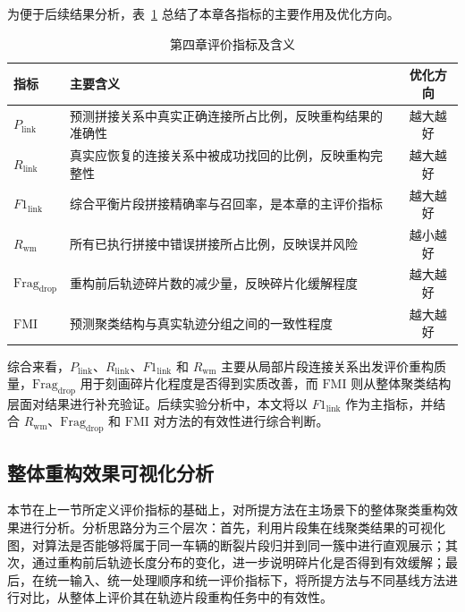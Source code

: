 \documentclass{xdupgthesis}
\begin{document}
为便于后续结果分析，表~\ref{tab:ch4_metric_summary} 总结了本章各指标的主要作用及优化方向。

\begin{table}[htbp]
	\centering
	\caption{第四章评价指标及含义}
	\label{tab:ch4_metric_summary}
	\renewcommand{\arraystretch}{1.2}
	\begin{tabular}{p{}p{}c}
		\toprule
		指标 & 主要含义 & 优化方向 \\
		\midrule
		$P_{\mathrm{link}}$ & 预测拼接关系中真实正确连接所占比例，反映重构结果的准确性 & 越大越好 \\
		$R_{\mathrm{link}}$ & 真实应恢复的连接关系中被成功找回的比例，反映重构完整性 & 越大越好 \\
		$F1_{\mathrm{link}}$ & 综合平衡片段拼接精确率与召回率，是本章的主评价指标 & 越大越好 \\
		$R_{\mathrm{wm}}$ & 所有已执行拼接中错误拼接所占比例，反映误并风险 & 越小越好 \\
		$\mathrm{Frag}_{\mathrm{drop}}$ & 重构前后轨迹碎片数的减少量，反映碎片化缓解程度 & 越大越好 \\
		$\mathrm{FMI}$ & 预测聚类结构与真实轨迹分组之间的一致性程度 & 越大越好 \\
		\bottomrule
	\end{tabular}
\end{table}

综合来看，$P_{\mathrm{link}}$、$R_{\mathrm{link}}$、$F1_{\mathrm{link}}$ 和 $R_{\mathrm{wm}}$ 主要从局部片段连接关系出发评价重构质量，$\mathrm{Frag}_{\mathrm{drop}}$ 用于刻画碎片化程度是否得到实质改善，而 $\mathrm{FMI}$ 则从整体聚类结构层面对结果进行补充验证。后续实验分析中，本文将以 $F1_{\mathrm{link}}$ 作为主指标，并结合 $R_{\mathrm{wm}}$、$\mathrm{Frag}_{\mathrm{drop}}$ 和 $\mathrm{FMI}$ 对方法的有效性进行综合判断。




\subsection{整体重构效果可视化分析}

本节在上一节所定义评价指标的基础上，对所提方法在主场景下的整体聚类重构效果进行分析。分析思路分为三个层次：首先，利用片段集在线聚类结果的可视化图，对算法是否能够将属于同一车辆的断裂片段归并到同一簇中进行直观展示；其次，通过重构前后轨迹长度分布的变化，进一步说明碎片化是否得到有效缓解；最后，在统一输入、统一处理顺序和统一评价指标下，将所提方法与不同基线方法进行对比，从整体上评价其在轨迹片段重构任务中的有效性。
\end{document}
